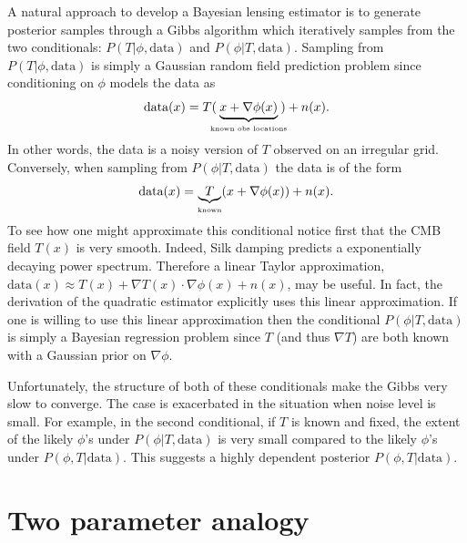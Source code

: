 \documentclass[iop,revtex4,apj,onecolumn]{emulateapj}
\begin{document}
A natural approach to develop a Bayesian lensing estimator is to generate posterior samples through a Gibbs algorithm which iteratively samples from the two conditionals: $P(T |  \phi,\text{data})$ and $P(\phi | T,  \text{data})$.
Sampling from $P(T |  \phi,\text{data})$ is simply a Gaussian random field prediction problem since conditioning on $\phi$ models the data as
\[
\text{data}(x) = T(\!\!\!\underbrace{x+\nabla\phi(x)}_\text{\tiny known obs locations}\!\!\!) + n(x).
\]
In other words, the data is a noisy version of  $T$ observed on an irregular grid. 
Conversely, when sampling from $P(\phi | T,\text{data})$ the data is of the form
\[
\text{data}(x) = \underbrace{\!\!T\!\!}_{\text{\tiny known}}(x+\nabla\phi(x)) + n(x). 
\]
To see how one might approximate this conditional notice first that the CMB field $T(x)$ is very smooth. Indeed, Silk damping  predicts  a exponentially decaying power spectrum. Therefore a linear Taylor approximation,  $\text{data}(x) \approx T(x) + \nabla T(x)\cdot \nabla\phi(x) + n(x)$, may be useful. In fact, the derivation of the quadratic estimator explicitly uses this linear approximation. 
If one is willing to use this linear approximation then the conditional $P(\phi | T,\text{data})$ is simply a Bayesian regression problem since $T$ (and thus $\nabla T$) are both known with a Gaussian prior on $\nabla \phi$.

Unfortunately, the structure of both of these conditionals make the Gibbs very slow to converge. The case is exacerbated in the situation when noise level is small. For example, in the second conditional, if $T$ is known and fixed, the extent of the likely $\phi$'s under $P(\phi|T,\text{data})$  is very small compared to the likely $\phi$'s under $P(\phi, T| \text{data})$. 
This suggests a highly dependent posterior $P(\phi, T| \text{data})$. 










%
%
\section{Two parameter analogy}
\label{two parameter system}
\end{document}
